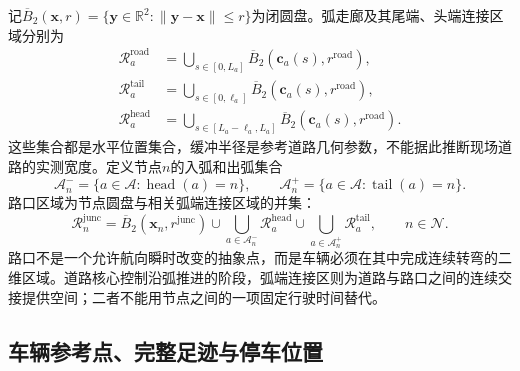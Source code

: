 记$\overline B_2(\mathbf x,r)=\{\mathbf y\in\mathbb R^2:\|\mathbf y-\mathbf x\|\le r\}$为闭圆盘。弧走廊及其尾端、头端连接区域分别为
\begin{align}
 \mathcal R_a^{\mathrm{road}}
 &=\bigcup_{s\in[0,L_a]}
        \overline B_2(\mathbf c_a(s),r^{\mathrm{road}}),
 \label{s0407:road_corridor}\\
 \mathcal R_a^{\mathrm{tail}}
 &=\bigcup_{s\in[0,\ell_a]}
        \overline B_2(\mathbf c_a(s),r^{\mathrm{road}}),
 \label{s0407:tail_connector}\\
 \mathcal R_a^{\mathrm{head}}
 &=\bigcup_{s\in[L_a-\ell_a,L_a]}
        \overline B_2(\mathbf c_a(s),r^{\mathrm{road}}).
 \label{s0407:head_connector}
\end{align}
这些集合都是水平位置集合，缓冲半径是参考道路几何参数，不能据此推断现场道路的实测宽度。定义节点$n$的入弧和出弧集合
\begin{equation}
 \mathcal A_n^-=
 \{a\in\mathcal A:\operatorname{head}(a)=n\},\qquad
 \mathcal A_n^+=
 \{a\in\mathcal A:\operatorname{tail}(a)=n\}.
 \label{s0407:incident_arcs}
\end{equation}
路口区域为节点圆盘与相关弧端连接区域的并集：
\begin{equation}
 \mathcal R_n^{\mathrm{junc}}
 =\overline B_2(\mathbf x_n,r^{\mathrm{junc}})
 \cup\bigcup_{a\in\mathcal A_n^-}\mathcal R_a^{\mathrm{head}}
 \cup\bigcup_{a\in\mathcal A_n^+}\mathcal R_a^{\mathrm{tail}},
 \qquad n\in\mathcal N.
 \label{s0407:junction_region}
\end{equation}
路口不是一个允许航向瞬时改变的抽象点，而是车辆必须在其中完成连续转弯的二维区域。道路核心控制沿弧推进的阶段，弧端连接区则为道路与路口之间的连续交接提供空间；二者不能用节点之间的一项固定行驶时间替代。

\subsection{车辆参考点、完整足迹与停车位置}

